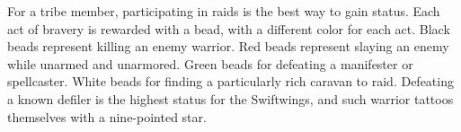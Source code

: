 For a tribe member, participating in raids is the best way to gain status. Each act of bravery is rewarded with a bead, with a different color for each act. Black beads represent killing an enemy warrior. Red beads represent slaying an enemy while unarmed and unarmored. Green beads for defeating a manifester or spellcaster. White beads for finding a particularly rich caravan to raid. Defeating a known defiler is the highest status for the Swiftwings, and such warrior tattoos themselves with a nine-pointed star.
